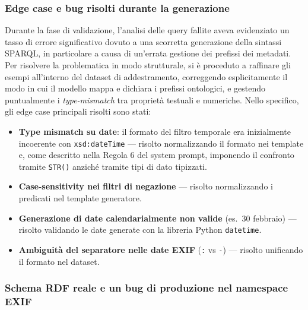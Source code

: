 \documentclass[12pt,a4paper,oneside]{book}
\newcommand{\code}[1]{\colorbox{light-gray}{\texttt{#1}}}
\begin{document}
\subsubsection{Edge case e bug risolti durante la generazione}\label{subsec:edge_cases_generazione}

Durante la fase di validazione, l'analisi delle query fallite aveva evidenziato un tasso di errore significativo dovuto a una scorretta generazione della sintassi SPARQL, in particolare a causa di un'errata gestione dei prefissi dei metadati. Per risolvere la problematica in modo strutturale, si è proceduto a raffinare gli esempi all'interno del dataset di addestramento, correggendo esplicitamente il modo in cui il modello mappa e dichiara i prefissi ontologici, e gestendo puntualmente i \textit{type-mismatch} tra proprietà testuali e numeriche. Nello specifico, gli edge case principali risolti sono stati:

\begin{itemize}
  \item \textbf{Type mismatch su date}: il formato del filtro temporale era inizialmente incoerente con \code{xsd:dateTime} --- risolto normalizzando il formato nei template e, come descritto nella Regola 6 del system prompt, imponendo il confronto tramite \code{STR()} anziché tramite tipi di dato tipizzati.
  \item \textbf{Case-sensitivity nei filtri di negazione} --- risolto normalizzando i predicati nel template generatore.
  \item \textbf{Generazione di date calendarialmente non valide} (es.\ 30 febbraio) --- risolto validando le date generate con la libreria Python \code{datetime}.
  \item \textbf{Ambiguità del separatore nelle date EXIF} (\code{:} vs \code{-}) --- risolto unificando il formato nel dataset.
\end{itemize}

\subsubsection{Schema RDF reale e un bug di produzione nel namespace EXIF}\label{subsec:bug_exif_namespace}
\end{document}
